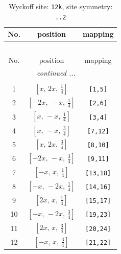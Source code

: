 \documentclass[fleqn,8pt]{jsarticle}
\begin{document}
\begin{longtable}{ccc}
\caption{Wyckoff site: {\tt 12k}, site symmetry: {\tt ..2}}
 \\
 \hline \hline
No. & position & mapping \\ \hline \endfirsthead

\multicolumn{2}{l}{\tablename\ \thetable{}} \\
 \hline \hline
No. & position & mapping \\ \hline \endhead

 \hline \hline
\multicolumn{2}{r}{\footnotesize\it continued ...} \\ \endfoot

 \hline \hline
\multicolumn{2}{r}{} \\ \endlastfoot

1 & $\left[ x,\, 2 x,\, \frac{1}{4} \right]$ & {\tt [1,5]} \\ \hline
2 & $\left[ - 2 x,\, - x,\, \frac{1}{4} \right]$ & {\tt [2,6]} \\ \hline
3 & $\left[ x,\, - x,\, \frac{1}{4} \right]$ & {\tt [3,4]} \\ \hline
4 & $\left[ x,\, - x,\, \frac{3}{4} \right]$ & {\tt [7,12]} \\ \hline
5 & $\left[ x,\, 2 x,\, \frac{3}{4} \right]$ & {\tt [8,10]} \\ \hline
6 & $\left[ - 2 x,\, - x,\, \frac{3}{4} \right]$ & {\tt [9,11]} \\ \hline
7 & $\left[ - x,\, x,\, \frac{1}{4} \right]$ & {\tt [13,18]} \\ \hline
8 & $\left[ - x,\, - 2 x,\, \frac{1}{4} \right]$ & {\tt [14,16]} \\ \hline
9 & $\left[ 2 x,\, x,\, \frac{1}{4} \right]$ & {\tt [15,17]} \\ \hline
10 & $\left[ - x,\, - 2 x,\, \frac{3}{4} \right]$ & {\tt [19,23]} \\ \hline
11 & $\left[ 2 x,\, x,\, \frac{3}{4} \right]$ & {\tt [20,24]} \\ \hline
12 & $\left[ - x,\, x,\, \frac{3}{4} \right]$ & {\tt [21,22]} \\
\end{longtable}
\renewcommand{\arraystretch}{1.2}
\end{document}
